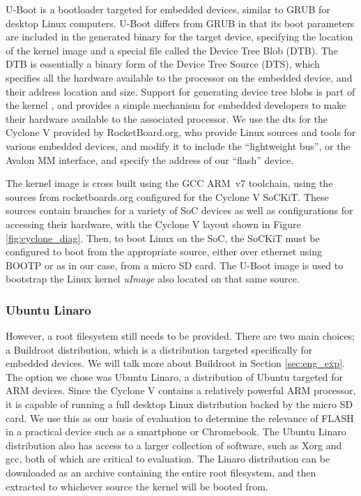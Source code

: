 \documentclass{sig-alternate-10pt}
\begin{document}
U-Boot is a bootloader targeted for embedded devices, similar to GRUB for
desktop Linux computers. U-Boot differs from GRUB in that its boot parameters
are included in the generated binary for the target device, specifying the
location of the kernel image and a special file called the Device Tree Blob
(DTB). The DTB is essentially a binary form of the Device Tree Source (DTS),
which specifies all the hardware available to the processor on the embedded
device, and their address location and size. Support for generating device
tree blobs is part of the kernel \cite{dts_Linux}, and provides a simple
mechanism for embedded developers to make their hardware available to the
associated processor. We use the dts for the Cyclone V provided by
RocketBoard.org, who provide Linux sources and tools for various embedded
devices, and modify it to include the ``lightweight bus'', or the Avalon MM
interface, and specify the address of our ``flash'' device.

The kernel image is cross built using the GCC ARM~v7 toolchain, using the
sources from rocketboards.org configured for the Cyclone V SoCKiT. These
sources contain branches for a variety of SoC devices as well as
configurations for accessing their hardware, with the Cyclone V layout shown
in Figure \ref{fig:cyclone_diag}. Then, to boot Linux on the SoC, the SoCKiT
must be configured to boot from the appropriate source, either over ethernet
using BOOTP or as in our case, from a micro SD card. The U-Boot image is
used to bootstrap the Linux kernel \emph{uImage} also located on that same
source. 

\subsubsection{Ubuntu Linaro}
\label{subsubsec:linaro}
However, a root filesystem still needs to be provided. There are two main choices; a Buildroot distribution, which is a distribution targeted specifically for embedded devices. We will talk more about Buildroot in Section \ref{sec:eng_exp}. The option we chose was Ubuntu Linaro, a distribution of Ubuntu targeted for ARM devices. Since the Cyclone V contains a relatively powerful ARM processor, it is capable of running a full desktop Linux distribution backed by the micro SD card. We use this as our basis of evaluation to determine the relevance of FLASH in a practical device such as a smartphone or Chromebook. The Ubuntu Linaro distribution also has access to a larger collection of software, such as Xorg and gcc, both of which are critical to evaluation. The Linaro distribution can be downloaded as an archive containing the entire root filesystem, and then extracted to whichever source the kernel will be booted from.
\end{document}
